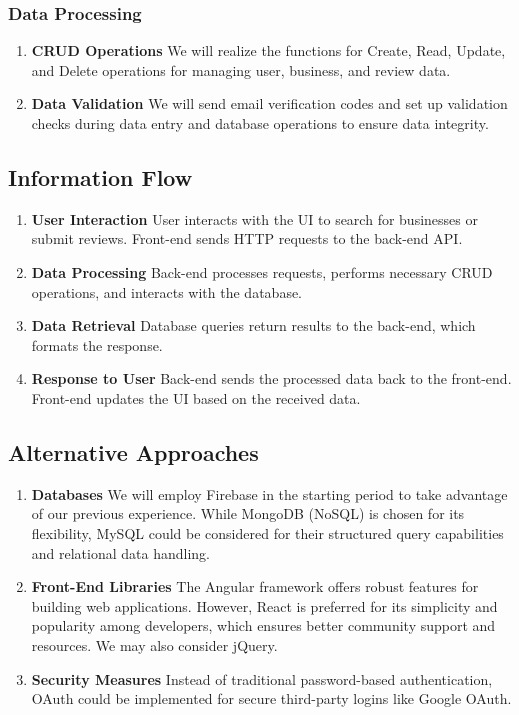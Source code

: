 \documentclass[10pt,twocolumn]{article}
\begin{document}
    \subsubsection{Data Processing}
    \begin{enumerate}
        \item \textbf{CRUD Operations} We will realize the functions for Create, Read, Update, and Delete operations for managing user, business, and review data.
        \item \textbf{Data Validation} We will send email verification codes and set up validation checks during data entry and database operations to ensure data integrity.
    \end{enumerate}
    \subsection{Information Flow}
    \begin{enumerate}
        \item \textbf{User Interaction} User interacts with the UI to search for businesses or submit reviews. Front-end sends HTTP requests to the back-end API.
        \item \textbf{Data Processing} Back-end processes requests, performs necessary CRUD operations, and interacts with the database.
        \item \textbf{Data Retrieval} Database queries return results to the back-end, which formats the response.
        \item \textbf{Response to User} Back-end sends the processed data back to the front-end. Front-end updates the UI based on the received data.

    \end{enumerate}
    \subsection{Alternative Approaches}
    \begin{enumerate}
        \item \textbf{Databases} We will employ Firebase in the starting period to take advantage of our previous experience. While MongoDB (NoSQL) is chosen for its flexibility, MySQL could be considered for their structured query capabilities and relational data handling.
        \item \textbf{Front-End Libraries} The Angular framework offers robust features for building web applications. However, React is preferred for its simplicity and popularity among developers, which ensures better community support and resources. We may also consider jQuery.
        \item \textbf{Security Measures} Instead of traditional password-based authentication, OAuth could be implemented for secure third-party logins like Google OAuth.
    \end{enumerate}
\end{document}
